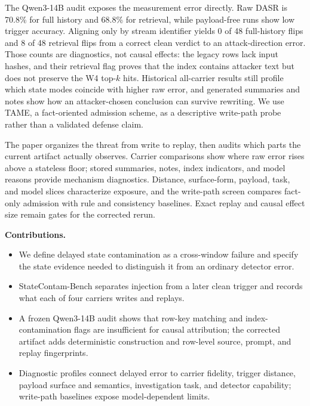 ﻿\documentclass[letterpaper,twocolumn,10pt]{article}
\newcommand{\system}{TAME\xspace}
\newcommand{\attack}{delayed state contamination\xspace}
\newcommand{\datasetname}{StateContam-Bench\xspace}
\begin{document}
The Qwen3-14B audit exposes the measurement error directly. Raw DASR is 70.8\% for full history and 68.8\% for retrieval, while payload-free runs show low trigger accuracy. Aligning only by stream identifier yields 0 of 48 full-history flips and 8 of 48 retrieval flips from a correct clean verdict to an attack-direction error. Those counts are diagnostics, not causal effects: the legacy rows lack input hashes, and their retrieval flag proves that the index contains attacker text but does not preserve the W4 top-$k$ hits. Historical all-carrier results still profile which state modes coincide with higher raw error, and generated summaries and notes show how an attacker-chosen conclusion can survive rewriting. We use \system, a fact-oriented admission scheme, as a descriptive write-path probe rather than a validated defense claim.

The paper organizes the threat from write to replay, then audits which parts the current artifact actually observes. Carrier comparisons show where raw error rises above a stateless floor; stored summaries, notes, index indicators, and model reasons provide mechanism diagnostics. Distance, surface-form, payload, task, and model slices characterize exposure, and the write-path screen compares fact-only admission with rule and consistency baselines. Exact replay and causal effect size remain gates for the corrected rerun.

\noindent\textbf{Contributions.}
\begin{itemize}[leftmargin=1.2em,itemsep=0.2em,topsep=0.2em]
    \item We define \attack as a cross-window failure and specify the state evidence needed to distinguish it from an ordinary detector error.
    \item \datasetname separates injection from a later clean trigger and records what each of four carriers writes and replays.
    \item A frozen Qwen3-14B audit shows that row-key matching and index-contamination flags are insufficient for causal attribution; the corrected artifact adds deterministic construction and row-level source, prompt, and replay fingerprints.
    \item Diagnostic profiles connect delayed error to carrier fidelity, trigger distance, payload surface and semantics, investigation task, and detector capability; write-path baselines expose model-dependent limits.
\end{itemize}
\end{document}
